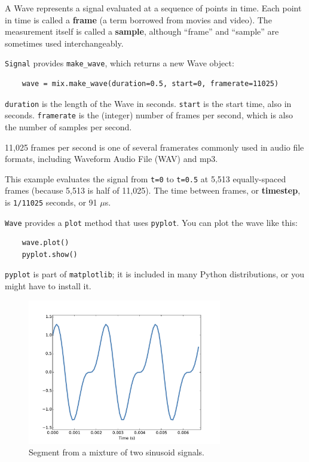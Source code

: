 \documentclass[12pt]{book}
\begin{document}
A Wave represents a signal evaluated at a sequence of points in
time.  Each point in time is called a {\bf frame} (a term borrowed
from movies and video).  The measurement itself is called a
{\bf sample}, although ``frame'' and ``sample'' are sometimes
used interchangeably.

{\tt Signal} provides \verb"make_wave", which returns a new
Wave object:

\begin{verbatim}
    wave = mix.make_wave(duration=0.5, start=0, framerate=11025)
\end{verbatim}

{\tt duration} is the length of the Wave in seconds.  {\tt start} is
the start time, also in seconds.  {\tt framerate} is the (integer)
number of frames per second, which is also the number of samples
per second.

11,025 frames per second is one of several framerates commonly used in
audio file formats, including Waveform Audio File (WAV) and mp3. 

This example evaluates the signal from {\tt t=0} to {\tt t=0.5} at
5,513 equally-spaced frames (because 5,513 is half of 11,025).
The time between frames, or {\bf timestep}, is {\tt 1/11025} seconds, or
91 $\mu$s.

{\tt Wave} provides a {\tt plot} method that uses {\tt pyplot}.
You can plot the wave like this:

\begin{verbatim}
    wave.plot()
    pyplot.show()
\end{verbatim}

{\tt pyplot} is part of {\tt matplotlib}; it is included in many
Python distributions, or you might have to install it.

\begin{figure}
\centerline{\includegraphics[height=2.5in]{figs/sounds4.pdf}}
\caption{Segment from a mixture of two sinusoid signals.}
\label{fig.sounds4}
\end{figure}
\end{document}
